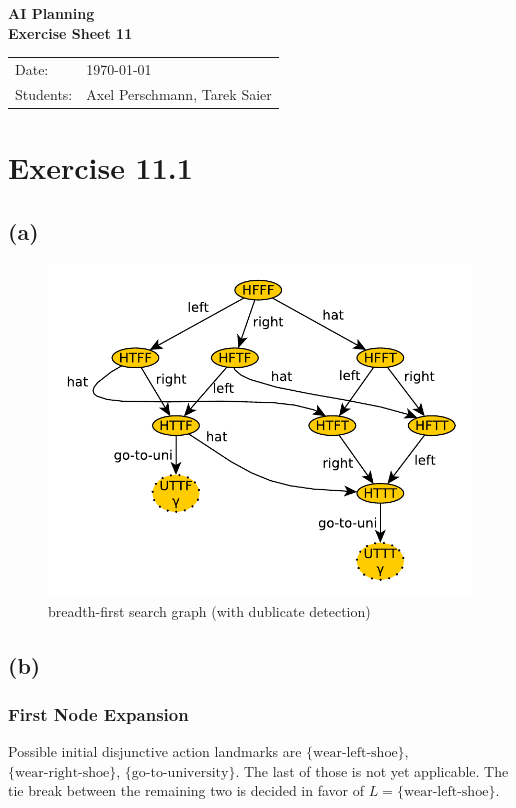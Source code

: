 \documentclass[11pt,a4paper]{article}
\newcommand{\sheetNr}{11}
\begin{document}
\begin{center}
\Huge{\textbf{AI Planning}}\\
\LARGE{\textbf{Exercise Sheet \sheetNr}}
\end{center}
\vspace{2cm}
\begin{tabular}{ll}
Date: & \today\\
Students: & Axel Perschmann, Tarek Saier
\end{tabular}

\section*{Exercise 11.1}
\subsection*{(a)}
\begin{figure}[h!]
\centering
\includegraphics[scale=0.7]{breadthFirstBasic}
\caption{breadth-first search graph (with dublicate detection)}
\end{figure}

\subsection*{(b)}
\subsubsection*{First Node Expansion}
Possible initial disjunctive action landmarks are $\{\text{wear-left-shoe}\}$, $\{\text{wear-right-shoe}\}$, $\{\text{go-to-university}\}$. The last of those is not yet applicable. The tie break between the remaining two is decided in favor of $L = \{\text{wear-left-shoe}\}$.\\
\end{document}
